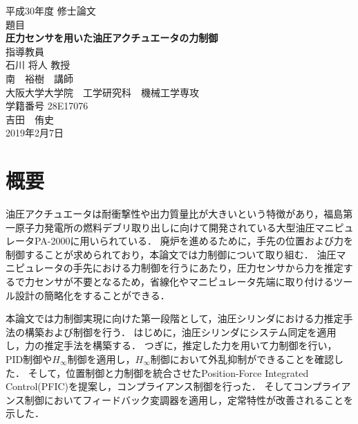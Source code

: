 \begin{titlepage}
\centering
\vspace*{40truept}
{\Large 平成30年度 修士論文} \\ %
\vspace{40truept} 
 {\Large 題目} \\
 \vspace{10truept} 
{\LARGE \textbf{圧力センサを用いた油圧アクチュエータの力制御}}\\ %
\vspace{10truept}
\vspace{120truept}
{\Large 指導教員}\\ %
 \vspace{10truept} 
{\Large 石川 将人 教授\\南　裕樹　講師}\\ %
\vspace{60truept}
{\Large 大阪大学大学院　工学研究科　機械工学専攻}\\ %
 \vspace{10truept} 
{\Large 学籍番号 28E17076}\\ %
\vspace{20truept}
{\LARGE 吉田　侑史}\\ %
\vspace{80truept}
{\Large 2019年2月7日} %
\end{titlepage}
\cleardoublepage
\chapter*{\huge 概要}
油圧アクチュエータは耐衝撃性や出力質量比が大きいという特徴があり，福島第一原子力発電所の燃料デブリ取り出しに向けて開発されている大型油圧マニピュレータPA-2000に用いられている．
廃炉を進めるために，手先の位置および力を制御することが求められており，本論文では力制御について取り組む．
油圧マニピュレータの手先における力制御を行うにあたり，圧力センサから力を推定するで力センサが不要となるため，省線化やマニピュレータ先端に取り付けるツール設計の簡略化をすることができる．

本論文では力制御実現に向けた第一段階として，油圧シリンダにおける力推定手法の構築および制御を行う．
はじめに，油圧シリンダにシステム同定を適用し，力の推定手法を構築する．
つぎに，推定した力を用いて力制御を行い，PID制御や$H_\infty$制御を適用し，$H_\infty$制御において外乱抑制ができることを確認した．
そして，位置制御と力制御を統合させたPosition-Force Integrated Control(PFIC)を提案し，コンプライアンス制御を行った．
そしてコンプライアンス制御においてフィードバック変調器を適用し，定常特性が改善されることを示した．
%
%


\newpage

\tableofcontents   %
\thispagestyle{plain}
\listoffigures %
\listoftables %

